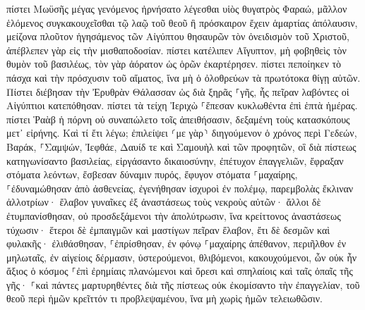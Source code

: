 \documentclass[twoside, 9pt]{extreport}
\begin{document}
πίστει Μωϋσῆς μέγας γενόμενος ἠρνήσατο λέγεσθαι υἱὸς θυγατρὸς Φαραώ, 
μᾶλλον ἑλόμενος συγκακουχεῖσθαι τῷ λαῷ τοῦ θεοῦ ἢ πρόσκαιρον ἔχειν ἁμαρτίας ἀπόλαυσιν, 
μείζονα πλοῦτον ἡγησάμενος τῶν Αἰγύπτου θησαυρῶν τὸν ὀνειδισμὸν τοῦ Χριστοῦ, ἀπέβλεπεν γὰρ εἰς τὴν μισθαποδοσίαν. 
πίστει κατέλιπεν Αἴγυπτον, μὴ φοβηθεὶς τὸν θυμὸν τοῦ βασιλέως, τὸν γὰρ ἀόρατον ὡς ὁρῶν ἐκαρτέρησεν. 
πίστει πεποίηκεν τὸ πάσχα καὶ τὴν πρόσχυσιν τοῦ αἵματος, ἵνα μὴ ὁ ὀλοθρεύων τὰ πρωτότοκα θίγῃ αὐτῶν. 
Πίστει διέβησαν τὴν Ἐρυθρὰν Θάλασσαν ὡς διὰ ξηρᾶς ⸀γῆς, ἧς πεῖραν λαβόντες οἱ Αἰγύπτιοι κατεπόθησαν. 
πίστει τὰ τείχη Ἰεριχὼ ⸀ἔπεσαν κυκλωθέντα ἐπὶ ἑπτὰ ἡμέρας. 
πίστει Ῥαὰβ ἡ πόρνη οὐ συναπώλετο τοῖς ἀπειθήσασιν, δεξαμένη τοὺς κατασκόπους μετ᾽ εἰρήνης. 
Καὶ τί ἔτι λέγω; ἐπιλείψει ⸂με γὰρ⸃ διηγούμενον ὁ χρόνος περὶ Γεδεών, Βαράκ, ⸀Σαμψών, Ἰεφθάε, Δαυίδ τε καὶ Σαμουὴλ καὶ τῶν προφητῶν, 
οἳ διὰ πίστεως κατηγωνίσαντο βασιλείας, εἰργάσαντο δικαιοσύνην, ἐπέτυχον ἐπαγγελιῶν, ἔφραξαν στόματα λεόντων, 
ἔσβεσαν δύναμιν πυρός, ἔφυγον στόματα ⸀μαχαίρης, ⸀ἐδυναμώθησαν ἀπὸ ἀσθενείας, ἐγενήθησαν ἰσχυροὶ ἐν πολέμῳ, παρεμβολὰς ἔκλιναν ἀλλοτρίων· 
ἔλαβον γυναῖκες ἐξ ἀναστάσεως τοὺς νεκροὺς αὐτῶν· ἄλλοι δὲ ἐτυμπανίσθησαν, οὐ προσδεξάμενοι τὴν ἀπολύτρωσιν, ἵνα κρείττονος ἀναστάσεως τύχωσιν· 
ἕτεροι δὲ ἐμπαιγμῶν καὶ μαστίγων πεῖραν ἔλαβον, ἔτι δὲ δεσμῶν καὶ φυλακῆς· 
ἐλιθάσθησαν, ⸀ἐπρίσθησαν, ἐν φόνῳ ⸀μαχαίρης ἀπέθανον, περιῆλθον ἐν μηλωταῖς, ἐν αἰγείοις δέρμασιν, ὑστερούμενοι, θλιβόμενοι, κακουχούμενοι, 
ὧν οὐκ ἦν ἄξιος ὁ κόσμος ⸀ἐπὶ ἐρημίαις πλανώμενοι καὶ ὄρεσι καὶ σπηλαίοις καὶ ταῖς ὀπαῖς τῆς γῆς· 
⸀καὶ πάντες μαρτυρηθέντες διὰ τῆς πίστεως οὐκ ἐκομίσαντο τὴν ἐπαγγελίαν, 
τοῦ θεοῦ περὶ ἡμῶν κρεῖττόν τι προβλεψαμένου, ἵνα μὴ χωρὶς ἡμῶν τελειωθῶσιν. 
\end{document}
